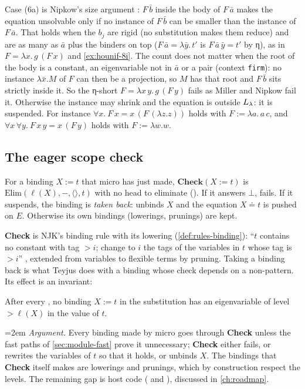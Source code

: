 \begin{tutorial}
Case (6a) is Nipkow's size argument \cite{Nipkow1993}: $F\,\bar b$ inside the body of $F\,\bar a$ makes the
equation unsolvable only if no instance of $F\,\bar b$ can be smaller than the instance of $F\,\bar a$. That
holds when the $b_j$ are rigid (no substitution makes them reduce) and are as many as $\bar a$ plus the
binders on top ($F\,\bar a = \lambda\bar y.\,t'$ is $F\,\bar a\,\bar y = t'$ by η), as in
$F = \lambda x.\,g\,(F\,x)$ and \cref{ex:hounif-8i}. The count does not matter when the root of the body is a
constant, an eigenvariable not in $\bar a$ or a pair (context \texttt{firm}): no instance $\lambda\bar x.M$ of
$F$ can then be a projection, so $M$ has that root and $F\,\bar b$ sits strictly inside it. So the η-short
$F = \lambda x\,y.\,g\,(F\,y)$ fails as Miller and Nipkow fail it. Otherwise the instance may shrink and the
equation is outside $L_\lambda$: it is suspended. For instance $\forall x.\ F\,x = x\,(F\,(\lambda z.z))$ holds
with $F := \lambda a.\,a\,c$, and $\forall x\,\forall y.\ F\,x\,y = x\,(F\,y)$ holds with $F := \lambda w.w$.
\end{tutorial}

\subsection{The eager scope check}

\begin{definition}[Check]\label{def:module-check}
For a binding $X := t$ that micro has just made, $\textbf{Check}(X:=t)$ is $\mathrm{Elim}(\ell(X), -,
\langle\rangle, t)$ with no head to eliminate (). If it answers $\bot$,  fails.
If it suspends, the binding is \emph{taken back}:  unbinds $X$ and the equation
$X \doteq t$ is pushed on $E$. Otherwise its own bindings (lowerings, prunings) are kept.
\end{definition}
\textbf{Check} is NJK's binding rule with its lowering (\cref{def:rules-binding}): \enquote{$t$ contains no
constant with tag $>i$; change to $i$ the tags of the variables in $t$ whose tag is $>i$}
\cite[p.\,16]{NadathurJayaramanKwon1995}, extended from variables to flexible terms by pruning. Taking a binding
back is what Teyjus does with a binding whose check depends on a non-pattern. Its effect is an invariant:
\begin{proposition}\label{prop:module-nocapture}
After every , no binding $X := t$ in the substitution has an eigenvariable of level $>\ell(X)$ in the
value of $t$.
\end{proposition}
{\emergencystretch=2em
\noindent\emph{Argument.} Every binding made by micro goes through \textbf{Check} unless the fast paths of
\cref{sec:module-fast} prove it unnecessary; \textbf{Check} either fails, or rewrites the variables of $t$ so
that it holds, or unbinds $X$. The bindings that \textbf{Check} itself makes are lowerings and prunings,
which by construction respect the levels. The remaining gap is host code ( and ),
discussed in \cref{ch:roadmap}. \hfill\qedsymbol\par}

